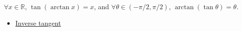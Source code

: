 \begin{remark*}
$\forall x\in\mathbb{R}$, $\tan(\arctan x)=x$, and
$\forall \theta\in(-\pi/2,\pi/2)$, $\arctan(\tan\theta)=\theta$.
\end{remark*}
\begin{dependencies}
\begin{itemize}
  \item \hyperref[def:inverse-tangent]{Inverse tangent}
\end{itemize}
\end{dependencies}
